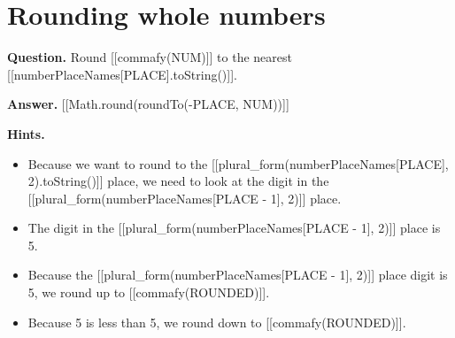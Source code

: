 \documentclass{article}
\begin{document}
\section*{Rounding whole numbers}
\textbf{Question.} Round [[commafy(NUM)]] to the nearest [[numberPlaceNames[PLACE].toString()]].

\textbf{Answer.} [[Math.round(roundTo(-PLACE, NUM))]]

\textbf{Hints.}
\begin{itemize}
  \item Because we want to round to the [[plural\_form(numberPlaceNames[PLACE], 2).toString()]] place, we need to look at the digit in the [[plural\_form(numberPlaceNames[PLACE - 1], 2)]] place.
  \item The digit in the [[plural\_form(numberPlaceNames[PLACE - 1], 2)]] place is 5.
  \item Because the [[plural\_form(numberPlaceNames[PLACE - 1], 2)]] place digit is 5,
            we round up to [[commafy(ROUNDED)]].
  \item Because 5 is less than 5, we round down to [[commafy(ROUNDED)]].
\end{itemize}
\end{document}
